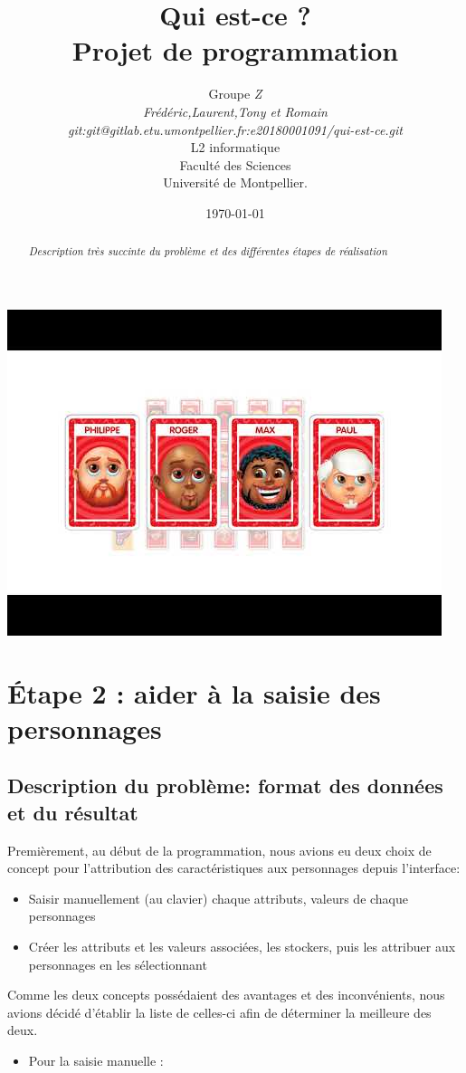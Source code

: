 \documentclass[a4paper]{article}
\title{  Qui est-ce ?\\         %
  Projet de programmation}
\author{Groupe \emph{Z}\\
  \emph{Frédéric,Laurent,Tony et Romain}\\
  \emph{git:git@gitlab.etu.umontpellier.fr:e20180001091/qui-est-ce.git}\\
  L2 informatique\\
  Faculté des Sciences\\
Université de Montpellier.}
\date{\today}
\begin{document}
\maketitle                    %

\begin{center}               %
  \includegraphics[scale=1]{img.jpg}   %
\end{center}

\tableofcontents

\begin{abstract}     %

  \emph{Description très succinte du problème et des différentes étapes de réalisation}

\end{abstract}



\section{Étape 2 : aider  à la saisie  des personnages}
\subsection{Description du problème: format des données et du résultat}
Premièrement, au début de la programmation, nous avions eu deux choix de concept pour l'attribution des caractéristiques aux personnages depuis l'interface:
\begin{itemize}
\item {Saisir manuellement (au clavier) chaque attributs, valeurs de chaque personnages}
\item {Créer les attributs et les valeurs associées, les stockers, puis les attribuer aux personnages en les sélectionnant} 
\end{itemize}
Comme les deux concepts possédaient des avantages et des inconvénients, nous avions décidé d'établir la liste de celles-ci afin de déterminer la meilleure des deux.
\begin{itemize}
\item {Pour la saisie manuelle :}
\end{itemize}
\end{document}

